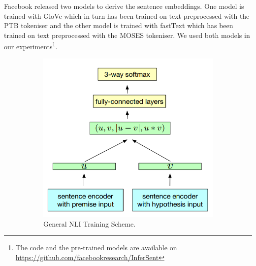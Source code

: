 Facebook released two models to derive the sentence embeddings. One model is trained with GloVe \cite{pennington-etal-2014-glove} which in turn has been trained on text preprocessed with the PTB tokeniser and the other model is trained with fastText \cite{mikolov-etal-2018-advances}  which has been trained on text preprocessed with the MOSES tokeniser. We used both models in our experiments\footnote{The code and the pre-trained models are available on \url{https://github.com/facebookresearch/InferSent}}.



\begin{figure}
	\captionsetup[subfigure]{justification=centering}
	\centering
	\begin{subfigure}[b]{.5\textwidth}
		\centering
		\includegraphics[width=\textwidth]{figures/semantic_textual_similarity/sentence_encoders/infersent_general.png}
		\caption{General NLI Training Scheme.}
		\label{fig:infersent_general}
	\end{subfigure}%
	\begin{subfigure}[b]{.5\textwidth}
		\centering

\end{subfigure}
\end{figure}
